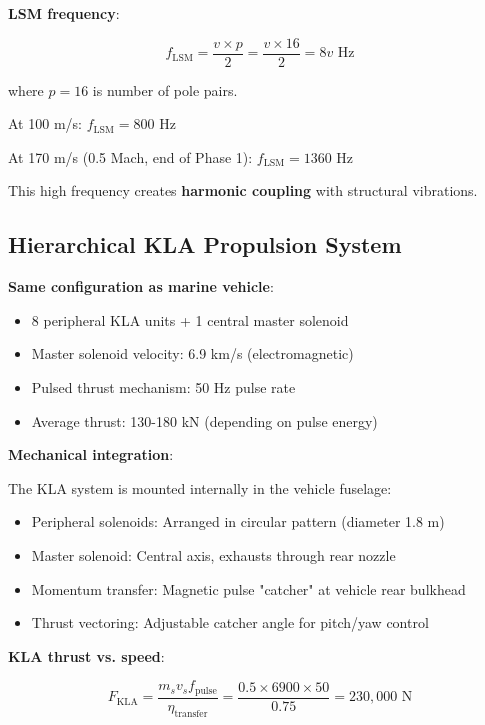 \documentclass[12pt,a4paper]{article}
\begin{document}
\textbf{LSM frequency}:

\begin{equation}
f_{\text{LSM}} = \frac{v \times p}{2} = \frac{v \times 16}{2} = 8v \text{ Hz}
\end{equation}

where $p = 16$ is number of pole pairs.

At 100 m/s: $f_{\text{LSM}} = 800$ Hz

At 170 m/s (0.5 Mach, end of Phase 1): $f_{\text{LSM}} = 1360$ Hz

This high frequency creates \textbf{harmonic coupling} with structural vibrations.

\subsection{Hierarchical KLA Propulsion System}

\textbf{Same configuration as marine vehicle}:
\begin{itemize}
\item 8 peripheral KLA units + 1 central master solenoid
\item Master solenoid velocity: 6.9 km/s (electromagnetic)
\item Pulsed thrust mechanism: 50 Hz pulse rate
\item Average thrust: 130-180 kN (depending on pulse energy)
\end{itemize}

\textbf{Mechanical integration}:

The KLA system is mounted internally in the vehicle fuselage:
\begin{itemize}
\item Peripheral solenoids: Arranged in circular pattern (diameter 1.8 m)
\item Master solenoid: Central axis, exhausts through rear nozzle
\item Momentum transfer: Magnetic pulse "catcher" at vehicle rear bulkhead
\item Thrust vectoring: Adjustable catcher angle for pitch/yaw control
\end{itemize}

\textbf{KLA thrust vs. speed}:

\begin{equation}
F_{\text{KLA}} = \frac{m_s v_s f_{\text{pulse}}}{\eta_{\text{transfer}}} = \frac{0.5 \times 6900 \times 50}{0.75} = 230,000 \text{ N}
\end{equation}
\end{document}
